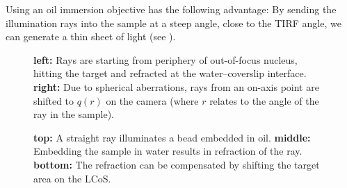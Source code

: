 Using an oil immersion objective has the following advantage: By
sending the illumination rays into the sample at a steep angle, close
to the TIRF angle, we can generate a thin sheet of light (see
).


\begin{figure}[!hbt]
  \centering
  \def\svgscale{.3}
  \qquad
  
  \caption{{\bf left:} Rays are starting from periphery of
    out-of-focus nucleus, hitting the target and refracted at the
    water--coverslip interface. {\bf right:} Due to spherical
    aberrations, rays from an on-axis point are shifted to $q(r)$ on
    the camera (where $r$ relates to the angle of the ray in the
    sample). }
  \label{fig:aberration-sketch}
\end{figure}

\begin{figure}[!hbt]
  \centering
  \def\svgscale{.3}
  
  \caption{{\bf top:} A straight ray illuminates a bead embedded in
    oil. {\bf middle:} Embedding the sample in water results in
    refraction of the ray. {\bf bottom:} The refraction can be
    compensated by shifting the target area on the LCoS.}
  \label{fig:shift-correction}
\end{figure}
 

